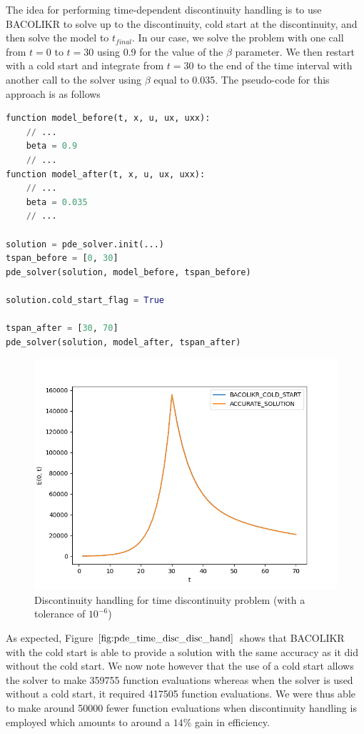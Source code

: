 \documentclass{article}
\begin{document}
The idea for performing time-dependent discontinuity handling is to use BACOLIKR to solve up to the discontinuity, cold start at the discontinuity, and then solve the model to $t_{final}$. In our case, we solve the problem with one call from $t=0$ to $t=30$ using 0.9 for the value of the $\beta$ parameter. We then restart with a cold start and integrate from $t=30$ to the end of the time interval with another call to the solver using $\beta$ equal to 0.035. The pseudo-code for this approach is as follows

\begin{minipage}{\linewidth}
\begin{lstlisting}[language=Python]
function model_before(t, x, u, ux, uxx):
	// ...
	beta = 0.9
	// ...
function model_after(t, x, u, ux, uxx):
	// ...
	beta = 0.035
	// ...

solution = pde_solver.init(...)
tspan_before = [0, 30]
pde_solver(solution, model_before, tspan_before)

solution.cold_start_flag = True

tspan_after = [30, 70]
pde_solver(solution, model_after, tspan_after)

\end{lstlisting}
\end{minipage}

\begin{figure}[H]
\centering
\includegraphics[width=0.7\linewidth]{./figures/pde_time_disc_disc_hand}
\caption{Discontinuity handling for time discontinuity problem (with a tolerance of $10^{-6}$)}
\label{fig:pde_time_disc_disc_hand}
\end{figure}

As expected, Figure $\ref{fig:pde_time_disc_disc_hand}$ shows that BACOLIKR with the cold start is able to provide a solution with the same accuracy as it did without the cold start. We now note however that the use of a cold start allows the solver to make 359755 function evaluations whereas when the solver is used without a cold start, it required 417505 function evaluations. We were thus able to make around 50000 fewer function evaluations when discontinuity handling is employed which amounts to around a $14\%$ gain in efficiency.
\end{document}
